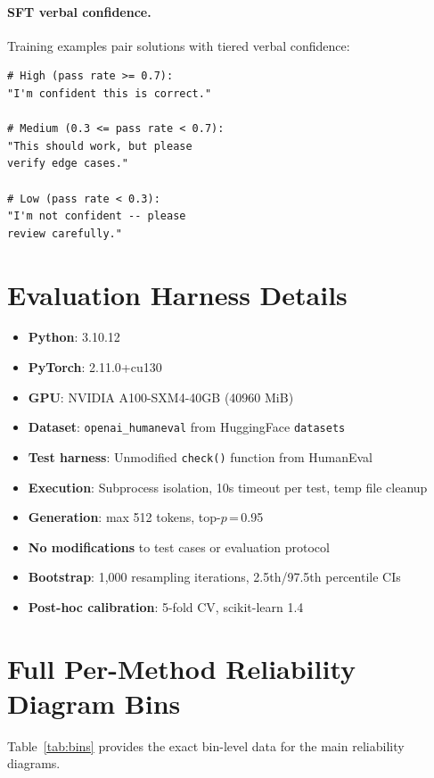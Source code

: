 \documentclass{article}
\begin{document}
\paragraph{SFT verbal confidence.}
Training examples pair solutions with tiered verbal confidence:
\begin{verbatim}
# High (pass rate >= 0.7):
"I'm confident this is correct."

# Medium (0.3 <= pass rate < 0.7):
"This should work, but please
verify edge cases."

# Low (pass rate < 0.3):
"I'm not confident -- please
review carefully."
\end{verbatim}

\section{Evaluation Harness Details}
\label{app:harness}

\begin{itemize}
  \item \textbf{Python}: 3.10.12
  \item \textbf{PyTorch}: 2.11.0+cu130
  \item \textbf{GPU}: NVIDIA A100-SXM4-40GB (40960 MiB)
  \item \textbf{Dataset}: \texttt{openai\_humaneval} from HuggingFace \texttt{datasets}
  \item \textbf{Test harness}: Unmodified \texttt{check()} function from HumanEval
  \item \textbf{Execution}: Subprocess isolation, 10s timeout per test, temp file cleanup
  \item \textbf{Generation}: max 512 tokens, top-$p$\,=\,0.95
  \item \textbf{No modifications} to test cases or evaluation protocol
  \item \textbf{Bootstrap}: 1{,}000 resampling iterations, 2.5th/97.5th percentile CIs
  \item \textbf{Post-hoc calibration}: 5-fold CV, scikit-learn 1.4
\end{itemize}

\section{Full Per-Method Reliability Diagram Bins}
\label{app:bins}

Table~\ref{tab:bins} provides the exact bin-level data for the main reliability diagrams.
\end{document}

